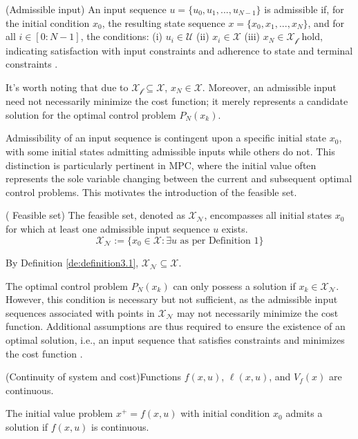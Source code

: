 \begin{definition}\label{de:definition3.1}
(Admissible input) An input sequence $u = \{u_0,u_1,...,u_{N-1}\}$ is admissible if, for the initial condition $x_0$, the resulting state sequence $x = \{x_0,x_1,...,x_N\}$, and for all $i \in [0:N-1]$, the conditions:
(i) $u_i \in \mathcal{U}$
(ii) $x_i \in \mathcal{X}$
(iii) $x_N \in \mathcal{X_f}$
hold, indicating satisfaction with input constraints and adherence to state and terminal constraints \cite{maiworm2021gaussian}.
\end{definition}

It's worth noting that due to $\mathcal{X_f} \subseteq \mathcal{X}$, $x_N \in \mathcal{X}$. Moreover, an admissible input need not necessarily minimize the cost function; it merely represents a candidate solution for the optimal control problem $P_N(x_k)$.

Admissibility of an input sequence is contingent upon a specific initial state $x_0$, with some initial states admitting admissible inputs while others do not. This distinction is particularly pertinent in MPC, where the initial value often represents the sole variable changing between the current and subsequent optimal control problems. This motivates the introduction of the feasible set.

\begin{definition}\label{de:definition3.2}
   ( Feasible set) The feasible set, denoted as $\mathcal{X_N}$, encompasses all initial states $x_0$ for which at least one admissible input sequence $u$ exists.
\[ \mathcal{X_N} := \{ x_0 \in \mathcal{X} : \exists u \text{ as per Definition 1} \} \]
\end{definition}


By Definition \ref{de:definition3.1}, $\mathcal{X_N} \subseteq \mathcal{X}$.

The optimal control problem $P_N(x_k)$ can only possess a solution if $x_k \in \mathcal{X_N}$. However, this condition is necessary but not sufficient, as the admissible input sequences associated with points in $\mathcal{X_N}$ may not necessarily minimize the cost function. Additional assumptions are thus required to ensure the existence of an optimal solution, i.e., an input sequence that satisfies constraints and minimizes the cost function \cite{maiworm2021gaussian}.

\begin{assumption} \label{assumption:assumption2}
(Continuity of system and cost)Functions $f(x,u)$, $\ell(x,u)$, and $V_f(x)$ are continuous. 
\end{assumption}
The initial value problem $x^+ = f(x,u)$ with initial condition $x_0$ admits a solution if $f(x,u)$ is continuous.

